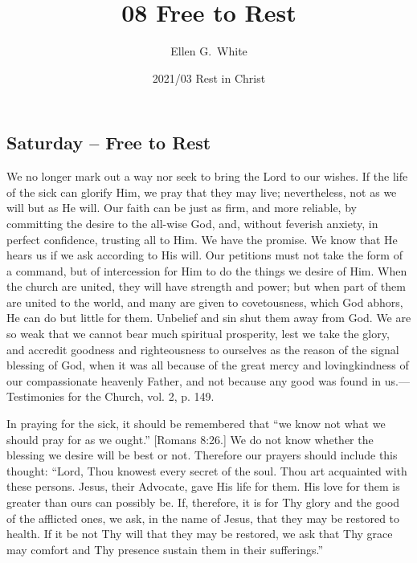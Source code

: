 \documentclass[a4paper, 10pt, twoside, headings=small]{scrartcl}
\title{08 Free to Rest}
\author{Ellen G.\ White}
\date{2021/03 Rest in Christ}
\begin{document}
\maketitle

\thispagestyle{empty}

\pagestyle{fancy}

\begin{multicols}{2}

\section*{Saturday – Free to Rest}

We no longer mark out a way nor seek to bring the Lord to our wishes. If the life of the sick can glorify Him, we pray that they may live; nevertheless, not as we will but as He will. Our faith can be just as firm, and more reliable, by committing the desire to the all-wise God, and, without feverish anxiety, in perfect confidence, trusting all to Him. We have the promise. We know that He hears us if we ask according to His will. Our petitions must not take the form of a command, but of intercession for Him to do the things we desire of Him. When the church are united, they will have strength and power; but when part of them are united to the world, and many are given to covetousness, which God abhors, He can do but little for them. Unbelief and sin shut them away from God. We are so weak that we cannot bear much spiritual prosperity, lest we take the glory, and accredit goodness and righteousness to ourselves as the reason of the signal blessing of God, when it was all because of the great mercy and lovingkindness of our compassionate heavenly Father, and not because any good was found in us.—Testimonies for the Church, vol. 2, p. 149.

In praying for the sick, it should be remembered that “we know not what we should pray for as we ought.” [Romans 8:26.] We do not know whether the blessing we desire will be best or not. Therefore our prayers should include this thought: “Lord, Thou knowest every secret of the soul. Thou art acquainted with these persons. Jesus, their Advocate, gave His life for them. His love for them is greater than ours can possibly be. If, therefore, it is for Thy glory and the good of the afflicted ones, we ask, in the name of Jesus, that they may be restored to health. If it be not Thy will that they may be restored, we ask that Thy grace may comfort and Thy presence sustain them in their sufferings.”


\end{multicols}
\end{document}
